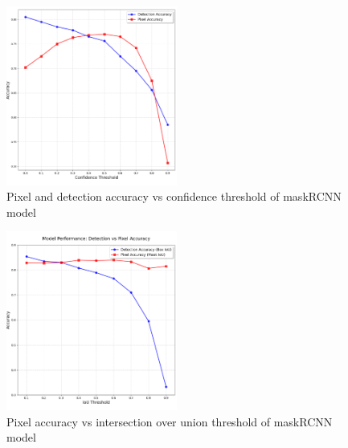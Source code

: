 \documentclass[final]{cmpreport_02}
\begin{document}
\begin{figure}[h!]
	\centering
	\includegraphics[width=0.5\textwidth]{./images/AEConfidenceCombined.png}
	\caption{Pixel and detection accuracy vs confidence threshold of maskRCNN model}
	\label{AE:Confidence}
\end{figure}

\begin{figure}[h!]
	\centering
	\includegraphics[width=0.5\textwidth]{./images/AEIOUCombined.png}
	\caption{Pixel accuracy vs intersection over union threshold of maskRCNN model}
	\label{AE:IOU}
\end{figure}
\end{document}
